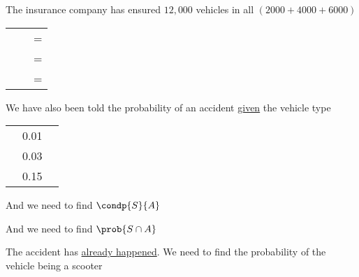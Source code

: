 \documentclass[14pt,fleqn]{extarticle}
\begin{document}
\begin{problem}
\begin{step}
\begin{options}
    \end{options} 
     \reason 
       
     The insurance company has ensured $12,000$ vehicles in all 
     $\left(2000 + 4000 + 6000 \right)$ 
     
     \begin{center}
  \begin{tabular}{NcN}
   \toprule
        &   &  \\
   \midrule 
    &  &  =  \\
    \midrule 
     &  &  =  \\
    \midrule
     &  &  =  \\
    \bottomrule
  \end{tabular}
\end{center}

We have also been told the probability of an accident \underline{given} the vehicle 
type 

\begin{center}
  \begin{tabular}{NNN}
   \toprule
        &  &  \\
   \midrule 
    & 0.01 &  \\
    \midrule 
     & 0.03 &  \\
    \midrule 
     & 0.15 &  \\
    \bottomrule
  \end{tabular}
\end{center}
\end{step}

\begin{step}
  \begin{options} 
     \correct 
       
       And we need to find $\condp{S}{A}$ 
     \incorrect
        
        And we need to find $\prob{S\cap A}$ 
        
    \end{options} 
     \reason 
     
     The accident has \underline{already happened}. We need to 
     find the probability of the vehicle being a scooter\newline 
     

\end{step}
\end{problem}
\end{document}
